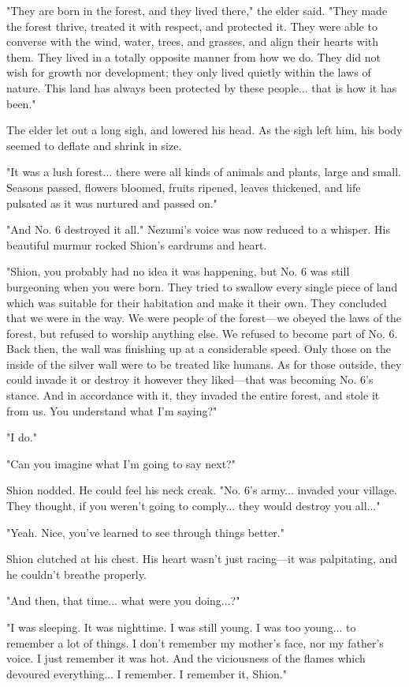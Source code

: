 "They are born in the forest, and they lived there," the elder said.
"They made the forest thrive, treated it with respect, and protected it.
They were able to converse with the wind, water, trees, and grasses, and
align their hearts with them. They lived in a totally opposite manner
from how we do. They did not wish for growth nor development; they only
lived quietly within the laws of nature. This land has always been
protected by these people... that is how it has been."

The elder let out a long sigh, and lowered his head. As the sigh left
him, his body seemed to deflate and shrink in size.

"It was a lush forest... there were all kinds of animals and plants,
large and small. Seasons passed, flowers bloomed, fruits ripened, leaves
thickened, and life pulsated as it was nurtured and passed on."

"And No. 6 destroyed it all." Nezumi's voice was now reduced to a
whisper. His beautiful murmur rocked Shion's eardrums and heart.

"Shion, you probably had no idea it was happening, but No. 6 was still
burgeoning when you were born. They tried to swallow every single piece
of land which was suitable for their habitation and make it their own.
They concluded that we were in the way. We were people of the forest---we
obeyed the laws of the forest, but refused to worship anything else. We
refused to become part of No. 6. Back then, the wall was finishing up at
a considerable speed. Only those on the inside of the silver wall were
to be treated like humans. As for those outside, they could invade it or
destroy it however they liked---that was becoming No. 6's stance. And in
accordance with it, they invaded the entire forest, and stole it from
us. You understand what I'm saying?"

"I do."

"Can you imagine what I'm going to say next?"

Shion nodded. He could feel his neck creak. "No. 6's army... invaded
your village. They thought, if you weren't going to comply... they would
destroy you all..."

"Yeah. Nice, you've learned to see through things better."

Shion clutched at his chest. His heart wasn't just racing---it was
palpitating, and he couldn't breathe properly.

"And then, that time... what were you doing...?"

"I was sleeping. It was nighttime. I was still young. I was too young...
to remember a lot of things. I don't remember my mother's face, nor my
father's voice. I just remember it was hot. And the viciousness of the
flames which devoured everything... I remember. I remember it, Shion."

